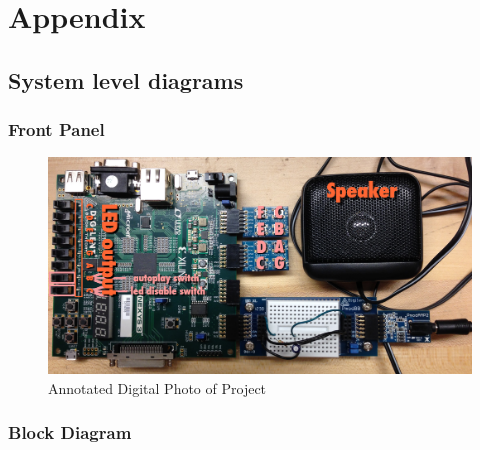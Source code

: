 \documentclass{article}
\begin{document}
\newpage
\section{Appendix}
  \listoffigures

  \subsection{System level diagrams}

    \subsubsection{Front Panel}
      

      \begin{figure}[H]
        \centering
        \includegraphics[width=6.5in]{img/annotated.jpg}
        \caption{Annotated Digital Photo of Project}
      \end{figure}

    \subsubsection{Block Diagram}
\end{document}
